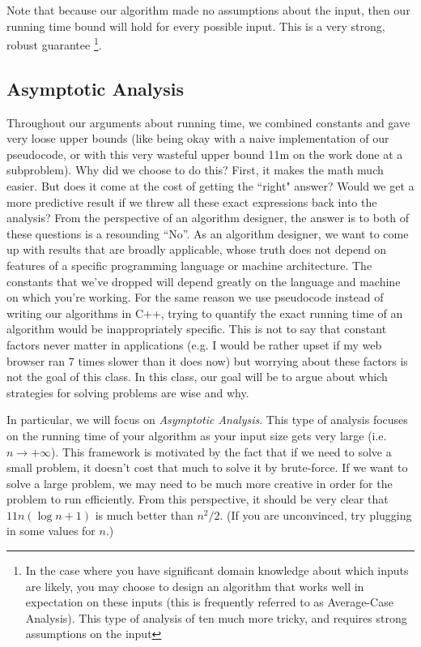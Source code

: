 \documentclass [12pt]{article}
\begin{document}
Note that because our algorithm made no assumptions about the input, then our running time bound will hold for every possible input. This is a very strong, robust guarantee \footnote{In the case where you have significant domain knowledge about which inputs are likely, you may choose to design an algorithm that works well in expectation on these inputs (this is frequently referred to as Average-Case Analysis). This type of analysis of ten much more tricky, and requires strong assumptions on the input}. 

\subsection{Asymptotic Analysis}

Throughout our arguments about running time, we combined constants  and gave very loose upper bounds (like being okay with a naive implementation of our pseudocode, or with this very wasteful upper bound 11m on the work done at a subproblem). Why did we choose to do this? First, it makes the math much easier. But does it come at the cost of getting the “right" answer? Would we get a more predictive result if we threw all these exact expressions back into the analysis? From the perspective of an algorithm designer, the answer is to both of these questions is a resounding ``No''. As an algorithm designer, we want to come up with results that are broadly applicable, whose truth does not depend on features of a specific programming language or machine architecture. The constants that we’ve dropped will depend greatly on the language and machine on which you’re working. For the same reason we use pseudocode instead of writing our algorithms in C++, trying to quantify the exact running time of an algorithm would be inappropriately specific. This is not to say that constant factors never matter in applications (e.g. I would be rather upset if my web browser ran 7 times slower than it does now) but worrying about these factors is not the goal of this class. In this class, our goal will be to argue about which strategies for solving problems are wise and why.

In particular, we will focus on \textit{Asymptotic Analysis}. This type of analysis focuses on the running time of your algorithm as your input size gets very large (i.e. $n \to +\infty$). This framework is motivated by the fact that if we need to solve a small problem, it doesn’t cost that much to solve it by brute-force. If we want to solve a large problem, we may need to be much more creative in order for the problem to run efficiently. From this perspective, it should be very clear that $11n(\log n + 1)$ is much better than $n^2/2$. (If you are unconvinced,
try plugging in some values for $n$.)
\end{document}
